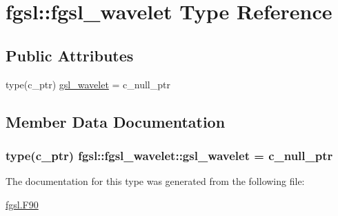 \hypertarget{structfgsl_1_1fgsl__wavelet}{}\section{fgsl\+:\+:fgsl\+\_\+wavelet Type Reference}
\label{structfgsl_1_1fgsl__wavelet}
\subsection*{Public Attributes}
\begin{DoxyCompactItemize}
\item 
type(c\+\_\+ptr) \hyperlink{structfgsl_1_1fgsl__wavelet_ae48ffae51c40ed145aac8a7fa07ac6ec}{gsl\+\_\+wavelet} = c\+\_\+null\+\_\+ptr
\end{DoxyCompactItemize}


\subsection{Member Data Documentation}
\hypertarget{structfgsl_1_1fgsl__wavelet_ae48ffae51c40ed145aac8a7fa07ac6ec}{}
\subsubsection[{gsl\+\_\+wavelet}]{\setlength{\rightskip}{0pt plus 5cm}type(c\+\_\+ptr) fgsl\+::fgsl\+\_\+wavelet\+::gsl\+\_\+wavelet = c\+\_\+null\+\_\+ptr}\label{structfgsl_1_1fgsl__wavelet_ae48ffae51c40ed145aac8a7fa07ac6ec}


The documentation for this type was generated from the following file\+:\begin{DoxyCompactItemize}
\item 
\hyperlink{fgsl_8F90}{fgsl.\+F90}\end{DoxyCompactItemize}
